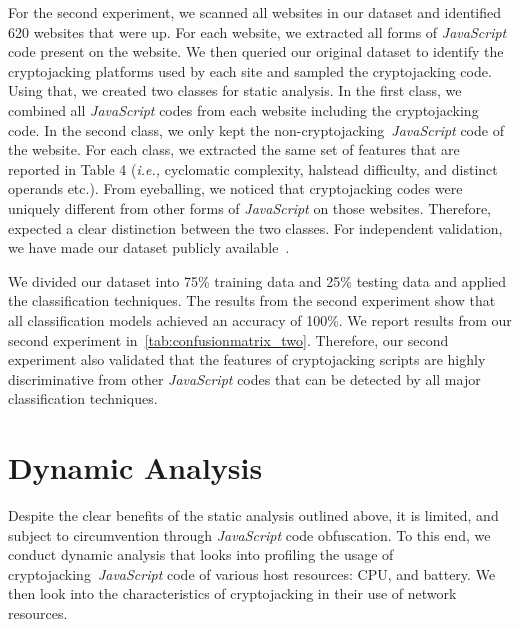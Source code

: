 \documentclass[acmlarge]{acmart}
\newcommand{\js}{{\em JavaScript}\xspace}
\newcommand{\etc}{{etc.}\xspace}
\newcommand{\ie}{{\em i.e.,}\xspace}
\newcommand{\cj}{cryptojacking\xspace}
\begin{document}
{{For the second experiment, we scanned all websites in our dataset and identified 620 websites that were up. For each website, we extracted all forms of \js code present on the website. We then queried our original dataset to identify the \cj platforms used by each site and sampled the \cj code. Using that, we created two classes for static analysis. In the first class, we combined all \js codes from each website including the \cj code. In the second class, we only kept the non-\cj~\js code of the website. For each class, we extracted the same set of features that are reported in Table 4 (\ie cyclomatic complexity, halstead difficulty, and distinct operands \etc). From eyeballing, we noticed that \cj codes were uniquely different from other forms of \js on those websites. Therefore, expected a clear distinction between the two classes. For independent validation, we have made our dataset publicly available~\cite{Saad20}. 

We divided our dataset into 75\% training data and 25\% testing data and applied the classification techniques. The results from the second experiment show that all classification models achieved an accuracy of 100\%. We report results from our second experiment in~\autoref{tab:confusionmatrix_two}. Therefore, our second experiment also validated that the features of \cj scripts are highly discriminative from other \js codes that can be detected by all major classification techniques. 
}}





\section{Dynamic Analysis} \label{sec:dynamic}
Despite the clear benefits of the static analysis outlined above, it is limited, and subject to circumvention through \js code obfuscation. To this end, we conduct dynamic analysis that looks into profiling the usage of \cj~\js code of various host resources: CPU, and battery. We then look into the characteristics of \cj in their use of network resources.

%
\end{document}

